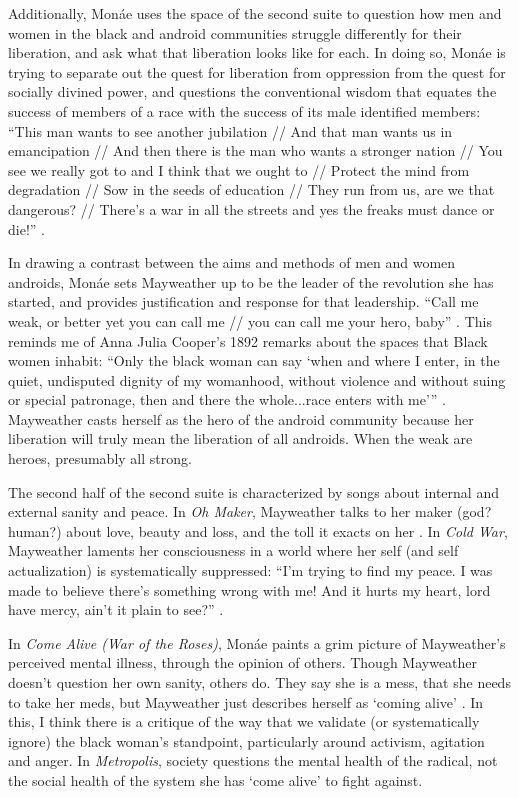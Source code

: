 \documentclass[a4paper, 11pt]{article} %
\begin{document}
Additionally, Mon\'ae uses the space of the second suite to question how men and women in the black and android communities struggle differently for their liberation, and ask what that liberation looks like for each.
In doing so, Mon\'ae is trying to separate out the quest for liberation from oppression from the quest for socially divined power, and questions the conventional wisdom that equates the success of members of a race with the success of its male identified members:
``This man wants to see another jubilation //
And that man wants us in emancipation //
And then there is the man who wants a stronger nation //
You see we really got to and I think that we ought to //
Protect the mind from degradation //
Sow in the seeds of education //
They run from us, are we that dangerous? //
There's a war in all the streets and yes the freaks must dance or die!'' \cite{danceordie}.

In drawing a contrast between the aims and methods of men and women androids, Mon\'ae sets Mayweather up to be the leader of the revolution she has started, and provides justification and response for that leadership.
``Call me weak, or better yet you can call me // you can call me your hero, baby'' \cite{faster}.
This reminds me of Anna Julia Cooper's 1892 remarks about the spaces that Black women inhabit:
``Only the black woman can say `when and where I enter, in the quiet, undisputed dignity of my womanhood, without violence and without suing or special patronage, then and there the whole...race enters with me''' \cite{cooper1892}.
Mayweather casts herself as the hero of the android community because her liberation will truly mean the liberation of all androids.
When the weak are heroes, presumably all strong.

The second half of the second suite is characterized by songs about internal and external sanity and peace.
In \emph{Oh Maker}, Mayweather talks to her maker (god? human?) about love, beauty and loss, and the toll it exacts on her \cite{ohmaker}.
In \emph{Cold War}, Mayweather laments her consciousness in a world where her self (and self actualization) is systematically suppressed:
``I'm trying to find my peace.  I was made to believe there's something wrong with me! And it hurts my heart, lord have mercy, ain't it plain to see?'' \cite{coldwar}. 

In \emph{Come Alive (War of the Roses)}, Mon\'ae paints a grim picture of Mayweather's perceived mental illness, through the opinion of others.
Though Mayweather doesn't question her own sanity, others do.  
They say she is a mess, that she needs to take her meds, but Mayweather just describes herself as `coming alive' \cite{roses}.
In this, I think there is a critique of the way that we validate (or systematically ignore) the black woman's standpoint, particularly around activism, agitation and anger.
In \emph{Metropolis}, society questions the mental health of the radical, not the social health of the system she has `come alive' to fight against.
\end{document}
